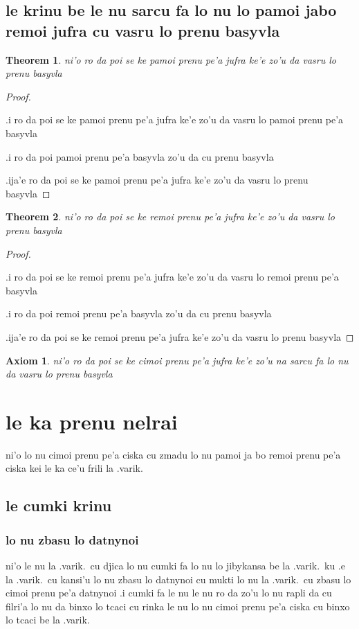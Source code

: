\documentclass{article}
\newtheorem{thm}{Theorem}
\newtheorem{axiom}{Axiom}
\begin{document}
\subsection{le krinu be le nu sarcu fa lo nu lo pamoi jabo remoi jufra cu vasru lo prenu basyvla}
\begin{thm}
	ni'o ro da poi se ke pamoi prenu pe'a jufra ke'e zo'u da vasru lo prenu basyvla
\end{thm}
\begin{proof}
	${}$

	.i ro da poi se ke pamoi prenu pe'a jufra ke'e zo'u da vasru lo pamoi prenu pe'a basyvla

	.i ro da poi pamoi prenu pe'a basyvla zo'u da cu prenu basyvla

	.ija'e ro da poi se ke pamoi prenu pe'a jufra ke'e zo'u da vasru lo prenu basyvla
\end{proof}
\begin{thm}
	ni'o ro da poi se ke remoi prenu pe'a jufra ke'e zo'u da vasru lo prenu basyvla
\end{thm}
\begin{proof}
	${ }$

	.i ro da poi se ke remoi prenu pe'a jufra ke'e zo'u da vasru lo remoi prenu pe'a basyvla

	.i ro da poi remoi prenu pe'a basyvla zo'u da cu prenu basyvla

	.ija'e ro da poi se ke remoi prenu pe'a jufra ke'e zo'u da vasru lo prenu basyvla
\end{proof}
\begin{axiom}
	ni'o ro da poi se ke cimoi prenu pe'a jufra ke'e zo'u na sarcu fa lo nu da vasru lo prenu basyvla
\end{axiom}

\section{le ka prenu nelrai}
ni'o lo nu cimoi prenu pe'a ciska cu zmadu lo nu pamoi ja bo remoi prenu pe'a ciska kei le ka ce'u frili la .varik.

\subsection{le cumki krinu}

\subsubsection{lo nu zbasu lo datnynoi}
ni'o le nu la .varik.\ cu djica lo nu cumki fa lo nu lo jibykansa be la .varik.\ ku .e la .varik.\ cu kansi'u lo nu zbasu lo datnynoi cu mukti lo nu la .varik.\ cu zbasu lo cimoi prenu pe'a datnynoi  .i cumki fa le nu le nu ro da zo'u lo nu rapli da cu filri'a lo nu da binxo lo tcaci cu rinka le nu lo nu cimoi prenu pe'a ciska cu binxo lo tcaci be la .varik.
\end{document}
